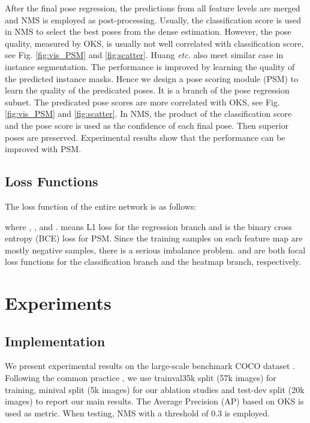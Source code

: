 \documentclass[11pt,twocolumn,journal]{IEEEtran}
\newcommand{\etc}{\emph{etc.} }
\newcommand{\fig}{Fig. }
\begin{document}
After the final pose regression, the predictions from all feature levels are merged and NMS is employed as post-processing. Usually, the classification score is used in NMS to select the best poses from the dense estimation. However, the pose quality, measured by OKS, is usually not well correlated with classification score, see \fig \ref{fig:vis_PSM} and \ref{fig:scatter}. Huang \etc \cite{maskScore2019} also meet similar case in instance segmentation. The performance is improved by learning the quality of the predicted instance masks. 
Hence we design a pose scoring module (PSM) to learn the quality of the predicated poses. It is a branch of the pose regression subnet. 
The predicated pose scores are more correlated with OKS, see \fig \ref{fig:vis_PSM} and \ref{fig:scatter}.  
In NMS, the product of the classification score and the pose score is used as the confidence of each final pose. Then superior poses are preserved. Experimental results show that the performance can be improved with PSM.

\subsection{Loss Functions} 
The loss function of the entire network is as follows:

where , ,  and .  means L1 loss for the regression branch and  is the binary cross entropy (BCE) loss for PSM. 
Since the training samples on each feature map are mostly negative samples, there is a serious imbalance problem.  and  are both focal loss functions \cite{lin2017focal} for the classification branch and the heatmap branch, respectively.







 \section{Experiments}
\subsection{Implementation}
We present experimental results on the large-scale benchmark COCO dataset \cite{coco14}. Following the common practice \cite{spm19, directpose19, pointset20}, we use trainval35k split (57k images) for training, minival split (5k images) for our ablation studies and test-dev split (20k images) to report our main results. The Average Precision (AP) based on OKS is used as metric. When testing, NMS \cite{bodla2017soft} with a threshold of 0.3 is employed.
\end{document}
